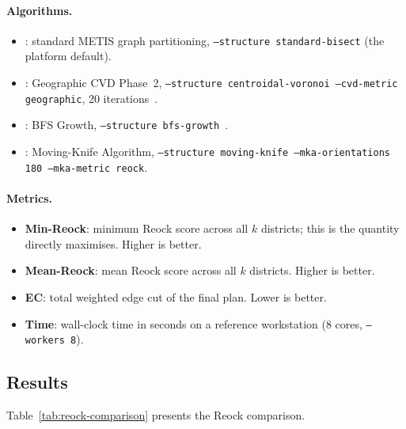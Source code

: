 \paragraph{Algorithms.}
\begin{itemize}
\item \textbf{\metis{}}: standard METIS graph partitioning,
  \texttt{--structure standard-bisect} (the platform default).
\item \textbf{\cvdgeo{}}: Geographic CVD Phase~2,
  \texttt{--structure centroidal-voronoi --cvd-metric geographic},
  20 iterations~\citep{dellaLibera2026cvdgeo}.
\item \textbf{\bfsg{}}: BFS Growth,
  \texttt{--structure bfs-growth}~\citep{dellaLibera2026bfs}.
\item \textbf{\mka{}}: Moving-Knife Algorithm,
  \texttt{--structure moving-knife --mka-orientations 180 --mka-metric reock}.
\end{itemize}

\paragraph{Metrics.}
\begin{itemize}
\item \textbf{Min-Reock}: minimum Reock score across all $k$ districts;
  this is the quantity \mka{} directly maximises.
  Higher is better.
\item \textbf{Mean-Reock}: mean Reock score across all $k$ districts.
  Higher is better.
\item \textbf{EC}: total weighted edge cut of the final plan.
  Lower is better.
\item \textbf{Time}: wall-clock time in seconds on a reference workstation
  (8 cores, \texttt{--workers 8}).
\end{itemize}

\subsection{Results}

Table~\ref{tab:reock-comparison} presents the Reock comparison.

